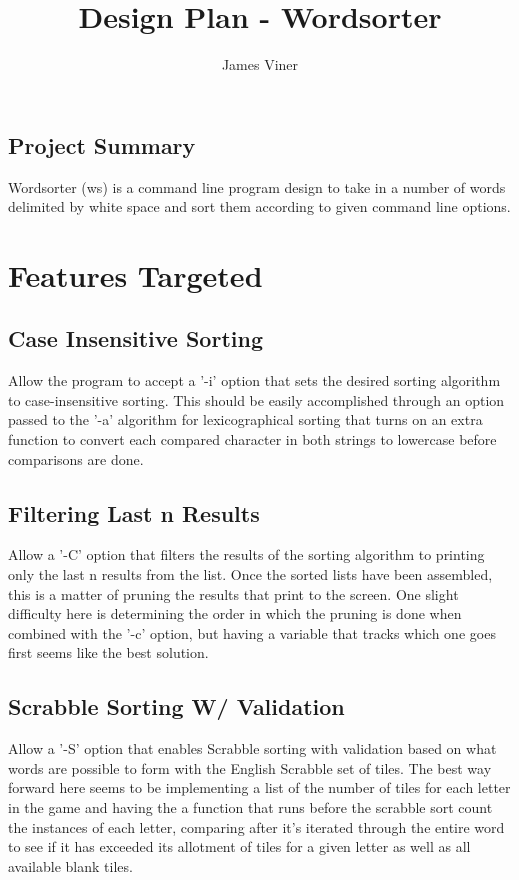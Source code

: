 \documentclass[11pt]{report}
\begin{document}
\title{Design Plan - Wordsorter}
\author{James Viner}
\date{} %
\maketitle

\onehalfspacing

\vspace*{\fill}
\begin{center}
\section*{\textbf{Project Summary}}
Wordsorter (ws) is a command line program design to take in a number of words delimited by white space and sort them according to given command line options.
\end{center}
\vfill
\pagebreak
\section*{Features Targeted}
\subsection*{Case Insensitive Sorting}
Allow the program to accept a '-i' option that sets the desired sorting algorithm to case-insensitive sorting. This should be easily accomplished through an option passed to the '-a' algorithm for lexicographical sorting that turns on an extra function to convert each compared character in both strings to lowercase before comparisons are done.
\subsection*{Filtering Last n Results}
Allow a '-C' option that filters the results of the sorting algorithm to printing only the last n results from the list. Once the sorted lists have been assembled, this is a matter of pruning the results that print to the screen. One slight difficulty here is determining the order in which the pruning is done when combined with the '-c' option, but having a variable that tracks which one goes first seems like the best solution.
\subsection*{Scrabble Sorting W/ Validation}
Allow a '-S' option that enables Scrabble sorting with validation based on what words are possible to form with the English Scrabble set of tiles. The best way forward here seems to be implementing a list of the number of tiles for each letter in the game and having the a function that runs before the scrabble sort count the instances of each letter, comparing after it's iterated through the entire word to see if it has exceeded its allotment of tiles for a given letter as well as all available blank tiles.
\pagebreak
\end{document}
